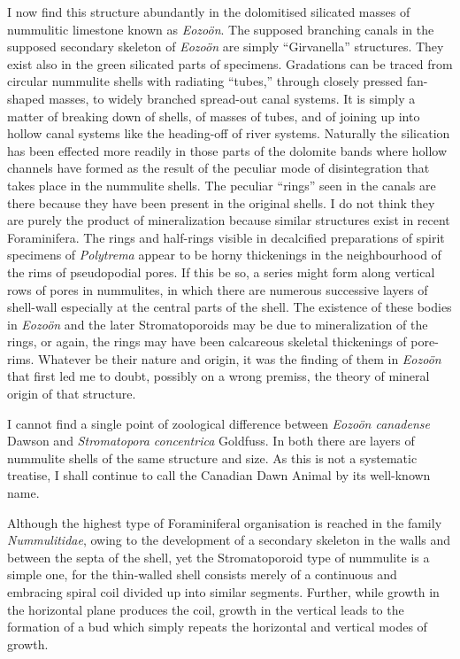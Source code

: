 \documentclass[a4paper, 12pt, oneside]{article}
\begin{document}
I now find this structure abundantly in the dolomitised silicated masses of nummulitic limestone known as \emph{Eozoön}. The supposed branching canals in the supposed secondary skeleton of \emph{Eozoön} are simply ``Girvanella'' structures. They exist also in the green silicated parts of specimens. Gradations can be traced from circular nummulite shells with radiating ``tubes,'' through closely pressed fan-shaped masses, to widely branched spread-out canal systems. It is simply a matter of breaking down of shells, of masses of tubes, and of joining up into hollow canal systems like the heading-off of river systems. Naturally the silication has been effected more readily in those parts of the dolomite bands where hollow channels have formed as the result of the peculiar mode of disintegration that takes place in the nummulite shells. The peculiar ``rings'' seen in the canals are there because they have been present in the original shells. I do not think they are purely the product of mineralization because similar structures exist in recent Foraminifera. The rings and half-rings visible in decalcified preparations of spirit specimens of \emph{Polytrema} appear to be horny thickenings in the neighbourhood of the rims of pseudopodial pores. If this be so, a series might form along vertical rows of pores in nummulites, in which there are numerous successive layers of shell-wall especially at the central parts of the shell. The existence of these bodies in \emph{Eozoön} and the later Stromatoporoids may be due to mineralization of the rings, or again, the rings may have been calcareous skeletal thickenings of pore-rims. Whatever be their nature and origin, it was the finding of them in \emph{Eozoön} that first led me to doubt, possibly on a wrong premiss, the theory of mineral origin of that structure.

I cannot find a single point of zoological difference between \emph{Eozoön canadense} Dawson and \emph{Stromatopora concentrica} Goldfuss. In both there are layers of nummulite shells of the same structure and size. As this is not a systematic treatise, I shall continue to call the Canadian Dawn Animal by its well-known name.

Although the highest type of Foraminiferal organisation is reached in the family \emph{Nummulitidae}, owing to the development of a secondary skeleton in the walls and between the septa of the shell, yet the Stromatoporoid type of nummulite is a simple one, for the thin-walled shell consists merely of a continuous and embracing spiral coil divided up into similar segments. Further, while growth in the horizontal plane produces the coil, growth in the vertical leads to the formation of a bud which simply repeats the horizontal and vertical modes of growth.
\end{document}
